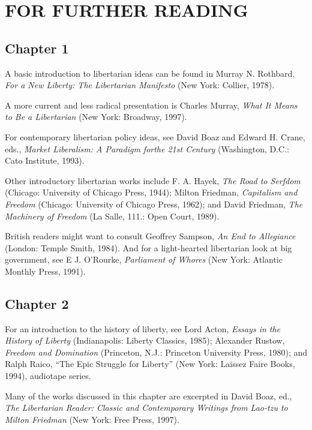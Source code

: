 \chapter*{FOR FURTHER READING}

\section*{Chapter 1}
A basic introduction to libertarian ideas can be found in Murray N. Rothbard, \textit{For a New Liberty: The Libertarian Manifesto} (New York: Collier, 1978).

A more current and less radical presentation is Charles Murray, \textit{What It Means to Be a Libertarian} (New York: Broadway, 1997). 

For contemporary libertarian policy ideas, see David Boaz and Edward H. Crane, eds., \textit{Market
Liberalism: A Paradigm forthe 21st Century} (Washington, D.C.: Cato Institute,
1993). 

Other introductory libertarian works include F. A. Hayek, \textit{The Road
to Serfdom} (Chicago: University of Chicago Press, 1944); Milton Friedman,
\textit{Capitalism and Freedom} (Chicago: University of Chicago Press, 1962); and
David Friedman, \textit{The Machinery of Freedom} (La Salle, 111.: Open Court, 1989).

British readers might want to consult Geoffrey Sampson, \textit{An End to Allegiance} (London: Temple Smith, 1984). And for a light-hearted libertarian look at big government, see E J. O'Rourke, \textit{Parliament of Whores} (New York:
Atlantic Monthly Press, 1991).

\section*{Chapter 2}
For an introduction to the history of liberty, see Lord Acton, \textit{Essays in the History of Liberty} (Indianapolis: Liberty Classics, 1985); Alexander Rustow,
\textit{Freedom and Domination} (Princeton, N.J.: Princeton University Press, 1980);
and Ralph Raico, ``The Epic Struggle for Liberty'' (New York: Laissez Faire
Books, 1994), audiotape series. 

Many of the works discussed in this chapter
are excerpted in David Boaz, ed., \textit{The Libertarian Reader: Classic and Contemporary Writings from Lao-tzu to Milton Friedman} (New York: Free Press, 1997).

